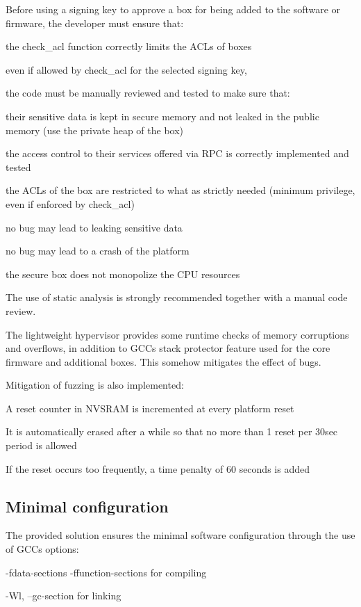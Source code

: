 Before using a signing key to approve a box for being added to the software or firmware, the developer must ensure that\+:
\begin{DoxyItemize}
\item the check\+\_\+acl function correctly limits the A\+C\+Ls of boxes
\item even if allowed by check\+\_\+acl for the selected signing key,
\item the code must be manually reviewed and tested to make sure that\+:
\begin{DoxyItemize}
\item their sensitive data is kept in secure memory and not leaked in the public memory (use the private heap of the box)
\item the access control to their services offered via R\+PC is correctly implemented and tested
\item the A\+C\+Ls of the box are restricted to what as strictly needed (minimum privilege, even if enforced by check\+\_\+acl)
\item no bug may lead to leaking sensitive data
\item no bug may lead to a crash of the platform
\item the secure box does not monopolize the C\+PU resources
\end{DoxyItemize}
\end{DoxyItemize}

The use of static analysis is strongly recommended together with a manual code review.

The lightweight hypervisor provides some runtime checks of memory corruptions and overflows, in addition to G\+CC\textquotesingle{}s stack protector feature used for the core firmware and additional boxes. This somehow mitigates the effect of bugs.

Mitigation of fuzzing is also implemented\+:
\begin{DoxyItemize}
\item A reset counter in N\+V\+S\+R\+AM is incremented at every platform reset
\item It is automatically erased after a while so that no more than 1 reset per 30sec period is allowed
\item If the reset occurs too frequently, a time penalty of 60 seconds is added
\end{DoxyItemize}\hypertarget{_p_c_i_g_u_i_d_a_n_c_e_sub_minconf}{}\subsection{Minimal configuration}\label{_p_c_i_g_u_i_d_a_n_c_e_sub_minconf}
The provided solution ensures the minimal software configuration through the use of G\+CC\textquotesingle{}s options\+:
\begin{DoxyItemize}
\item -\/fdata-\/sections -\/ffunction-\/sections for compiling
\item -\/\+Wl, --gc-\/section for linking
\end{DoxyItemize}

